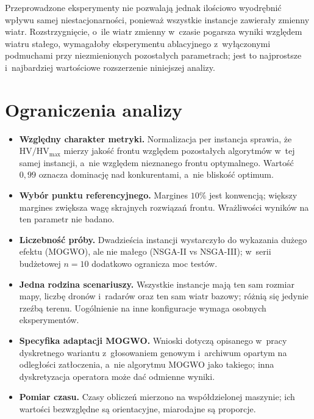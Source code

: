 Przeprowadzone eksperymenty nie pozwalają jednak ilościowo wyodrębnić wpływu
samej niestacjonarności, ponieważ wszystkie instancje zawierały zmienny wiatr.
Rozstrzygnięcie, o~ile wiatr zmienny w~czasie pogarsza wyniki względem wiatru
stałego, wymagałoby eksperymentu ablacyjnego z~wyłączonymi podmuchami przy
niezmienionych pozostałych parametrach; jest to najprostsze i~najbardziej
wartościowe rozszerzenie niniejszej analizy.

\section{Ograniczenia analizy}
\label{sec:analiza_ograniczenia}

\begin{itemize}
    \item \textbf{Względny charakter metryki.} Normalizacja per instancja sprawia,
    że $\mathrm{HV}/\mathrm{HV}_{\max}$ mierzy jakość frontu względem pozostałych
    algorytmów w~tej samej instancji, a~nie względem nieznanego frontu
    optymalnego. Wartość $0{,}99$ oznacza dominację nad konkurentami, a~nie
    bliskość optimum.
    \item \textbf{Wybór punktu referencyjnego.} Margines $10\%$ jest konwencją;
    większy margines zwiększa wagę skrajnych rozwiązań frontu. Wrażliwości
    wyników na ten parametr nie badano.
    \item \textbf{Liczebność próby.} Dwadzieścia instancji wystarczyło do
    wykazania dużego efektu (MOGWO), ale nie małego (NSGA-II vs NSGA-III);
    w~serii budżetowej $n = 10$ dodatkowo ogranicza moc testów.
    \item \textbf{Jedna rodzina scenariuszy.} Wszystkie instancje mają ten sam
    rozmiar mapy, liczbę dronów i~radarów oraz ten sam wiatr bazowy; różnią się
    jedynie rzeźbą terenu. Uogólnienie na inne konfiguracje wymaga osobnych
    eksperymentów.
    \item \textbf{Specyfika adaptacji MOGWO.} Wnioski dotyczą opisanego
    w~pracy dyskretnego wariantu z~głosowaniem genowym i~archiwum opartym na
    odległości zatłoczenia, a~nie algorytmu MOGWO jako takiego; inna dyskretyzacja
    operatora może dać odmienne wyniki.
    \item \textbf{Pomiar czasu.} Czasy obliczeń mierzono na współdzielonej
    maszynie; ich wartości bezwzględne są orientacyjne, miarodajne są proporcje.
\end{itemize}
